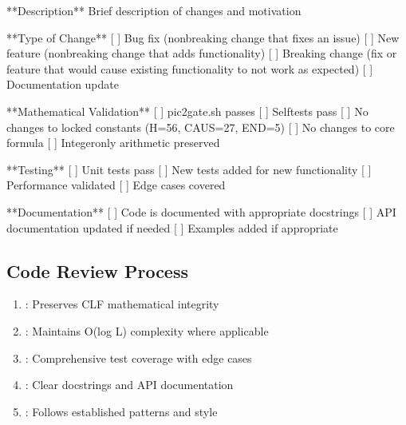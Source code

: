 \documentclass[letterpaper,10pt,english]{sphinxmanual}
\begin{document}
\begin{sphinxVerbatim}[commandchars=\\\{\}]
**Description**
Brief description of changes and motivation

**Type of Change**
\PYGZhy{} [ ] Bug fix (non\PYGZhy{}breaking change that fixes an issue)
\PYGZhy{} [ ] New feature (non\PYGZhy{}breaking change that adds functionality)
\PYGZhy{} [ ] Breaking change (fix or feature that would cause existing functionality to not work as expected)
\PYGZhy{} [ ] Documentation update

**Mathematical Validation**
\PYGZhy{} [ ] pic2\PYGZus{}gate.sh passes
\PYGZhy{} [ ] Self\PYGZhy{}tests pass
\PYGZhy{} [ ] No changes to locked constants (H=56, CAUS=27, END=5)
\PYGZhy{} [ ] No changes to core formula
\PYGZhy{} [ ] Integer\PYGZhy{}only arithmetic preserved

**Testing**
\PYGZhy{} [ ] Unit tests pass
\PYGZhy{} [ ] New tests added for new functionality
\PYGZhy{} [ ] Performance validated
\PYGZhy{} [ ] Edge cases covered

**Documentation**
\PYGZhy{} [ ] Code is documented with appropriate docstrings
\PYGZhy{} [ ] API documentation updated if needed
\PYGZhy{} [ ] Examples added if appropriate
\end{sphinxVerbatim}


\subsection{Code Review Process}
\label{\detokenize{contributing:code-review-process}}
\sphinxAtStartPar
{}
\begin{enumerate}
%
\item {} 
\sphinxAtStartPar
{}: Preserves CLF mathematical integrity

\item {} 
\sphinxAtStartPar
{}: Maintains O(log L) complexity where applicable

\item {} 
\sphinxAtStartPar
{}: Comprehensive test coverage with edge cases

\item {} 
\sphinxAtStartPar
{}: Clear docstrings and API documentation

\item {} 
\sphinxAtStartPar
{}: Follows established patterns and style

\end{enumerate}
\end{document}

